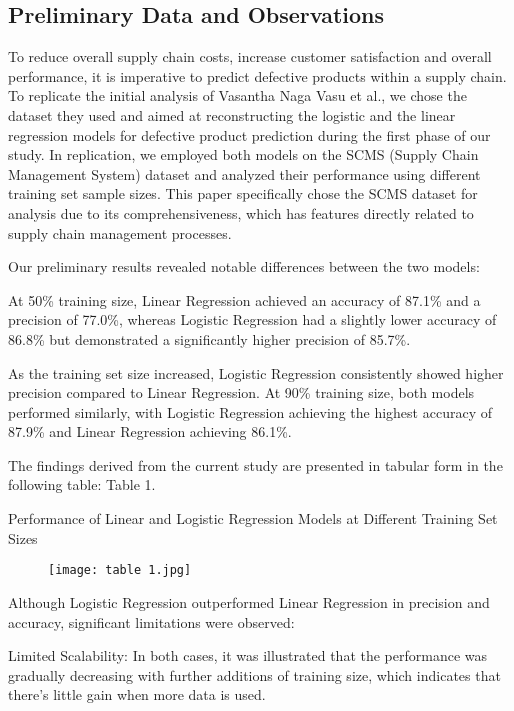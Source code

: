 \documentclass[conference]{IEEEtran}
\begin{document}
\subsection{Preliminary Data and Observations}

To reduce overall supply chain costs, increase customer satisfaction and overall performance, it is imperative to predict defective products within a supply chain. To replicate the initial analysis of Vasantha Naga Vasu et al., we chose the dataset they used and aimed at reconstructing the logistic and the linear regression models for defective product prediction during the first phase of our study. In replication, we employed both models on the SCMS (Supply Chain Management System) dataset and analyzed their performance using different training set sample sizes. This paper specifically chose the SCMS dataset for analysis due to its comprehensiveness, which has features directly related to supply chain management processes.

Our preliminary results revealed notable differences between the two models:

At 50\% training size, Linear Regression achieved an accuracy of 87.1\% and a precision of 77.0\%, whereas Logistic Regression had a slightly lower accuracy of 86.8\% but demonstrated a significantly higher precision of 85.7\%. 

As the training set size increased, Logistic Regression consistently showed higher precision compared to Linear Regression. At 90\% training size, both models performed similarly, with Logistic Regression achieving the highest accuracy of 87.9\% and Linear Regression achieving 86.1\%.

The findings derived from the current study are presented in tabular form in the following table: Table 1.

\begin{table}[htbp]
\caption{Performance of Linear and Logistic Regression Models at Different Training Set Sizes}
\end{table}
\vspace{-2.5em} 
\begin{figure}[h]
    \centering
    \texttt{[image: table 1.jpg]}
\end{figure}

Although Logistic Regression outperformed Linear Regression in precision and accuracy, significant limitations were observed:

Limited Scalability: In both cases, it was illustrated that the performance was gradually decreasing with further additions of training size, which indicates that there’s little gain when more data is used.
\end{document}
